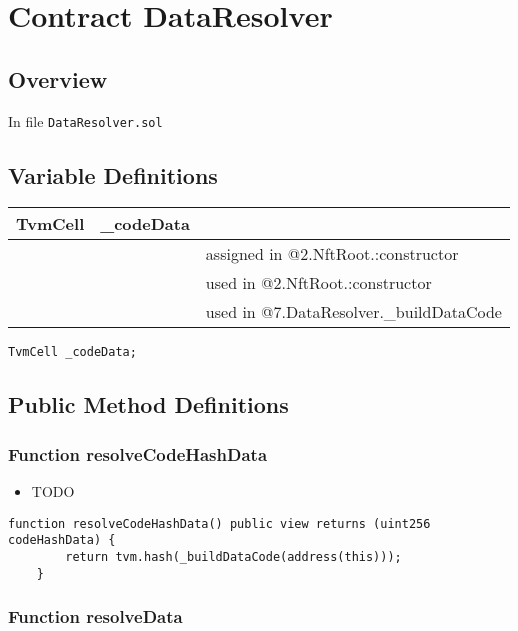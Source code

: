 
\chapter{Contract DataResolver}

\minitoc

\section{Overview}


In file {\tt DataResolver.sol}

\section{Variable Definitions}


\ifsoltables
\noindent\begin{tabular}{|l|l|p{5cm}|}\hline
TvmCell & \_{}codeData &  \\\hline
 & & assigned in @2.NftRoot.:constructor\\\hline
 & & used in @2.NftRoot.:constructor\\\hline
 & & used in @7.DataResolver.\_{}buildDataCode\\\hline
\end{tabular}
\fi


\begin{lstlisting}[firstnumber=11]
    TvmCell _codeData;
\end{lstlisting}

\section{Public Method Definitions}


\subsection{Function resolveCodeHashData}

\begin{itemize}
\item TODO
\end{itemize}

\begin{lstlisting}[firstnumber=13]
    function resolveCodeHashData() public view returns (uint256 codeHashData) {
        return tvm.hash(_buildDataCode(address(this)));
    }
\end{lstlisting}

\subsection{Function resolveData}


